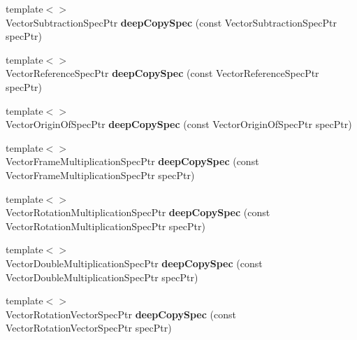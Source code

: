 \begin{DoxyCompactItemize}
\item 
\hypertarget{namespacegiskard__suturo_ab841d895171495d53dab15a908c728ce}{{\footnotesize template$<$$>$ }\\Vector\-Subtraction\-Spec\-Ptr {\bfseries deep\-Copy\-Spec} (const Vector\-Subtraction\-Spec\-Ptr spec\-Ptr)}\label{namespacegiskard__suturo_ab841d895171495d53dab15a908c728ce}

\item 
\hypertarget{namespacegiskard__suturo_ac0433f3f6d27117a53ed92c4801dc1ed}{{\footnotesize template$<$$>$ }\\Vector\-Reference\-Spec\-Ptr {\bfseries deep\-Copy\-Spec} (const Vector\-Reference\-Spec\-Ptr spec\-Ptr)}\label{namespacegiskard__suturo_ac0433f3f6d27117a53ed92c4801dc1ed}

\item 
\hypertarget{namespacegiskard__suturo_a67541ae0f543011de3e7e42da695493d}{{\footnotesize template$<$$>$ }\\Vector\-Origin\-Of\-Spec\-Ptr {\bfseries deep\-Copy\-Spec} (const Vector\-Origin\-Of\-Spec\-Ptr spec\-Ptr)}\label{namespacegiskard__suturo_a67541ae0f543011de3e7e42da695493d}

\item 
\hypertarget{namespacegiskard__suturo_ad6da771760e16afb0e9227b7e76e72b7}{{\footnotesize template$<$$>$ }\\Vector\-Frame\-Multiplication\-Spec\-Ptr {\bfseries deep\-Copy\-Spec} (const Vector\-Frame\-Multiplication\-Spec\-Ptr spec\-Ptr)}\label{namespacegiskard__suturo_ad6da771760e16afb0e9227b7e76e72b7}

\item 
\hypertarget{namespacegiskard__suturo_a913ce54c31e4ad5b6b02117d9b31bd84}{{\footnotesize template$<$$>$ }\\Vector\-Rotation\-Multiplication\-Spec\-Ptr {\bfseries deep\-Copy\-Spec} (const Vector\-Rotation\-Multiplication\-Spec\-Ptr spec\-Ptr)}\label{namespacegiskard__suturo_a913ce54c31e4ad5b6b02117d9b31bd84}

\item 
\hypertarget{namespacegiskard__suturo_a0736f9820d21ff113e6a6e4cbe01aa0e}{{\footnotesize template$<$$>$ }\\Vector\-Double\-Multiplication\-Spec\-Ptr {\bfseries deep\-Copy\-Spec} (const Vector\-Double\-Multiplication\-Spec\-Ptr spec\-Ptr)}\label{namespacegiskard__suturo_a0736f9820d21ff113e6a6e4cbe01aa0e}

\item 
\hypertarget{namespacegiskard__suturo_af0f1a85012bb8d019bd710d1bb1037bb}{{\footnotesize template$<$$>$ }\\Vector\-Rotation\-Vector\-Spec\-Ptr {\bfseries deep\-Copy\-Spec} (const Vector\-Rotation\-Vector\-Spec\-Ptr spec\-Ptr)}\label{namespacegiskard__suturo_af0f1a85012bb8d019bd710d1bb1037bb}


\end{DoxyCompactItemize}
